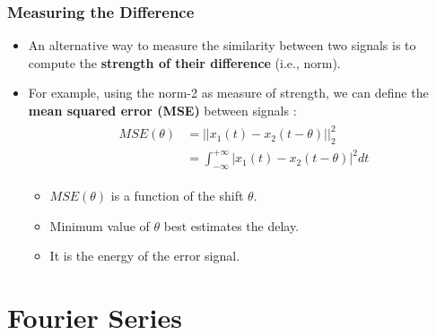\documentclass[12pt,a4paper]{article}
\begin{document}
 
\subsubsection{Measuring the Difference}
\begin{itemize}
\item An alternative way to measure the similarity between two signals is to compute the \textbf{strength of their difference} (i.e., norm). 

\item For example, using the norm-2 as measure of strength, we can define the \textbf{mean squared error (MSE)} between signals :
\begin{align*} \begin{split} 
MSE(\theta) &= \lvert \lvert x_{1}(t) - x_{2}(t-\theta) \rvert \rvert_{2}^{2}\\
&=\int_{-\infty}^{+\infty}  \lvert x_{1}(t) - x_{2}(t-\theta) \rvert^{2} dt
\end{split} \end{align*}
\begin{itemize}
\item $MSE(\theta)$ is a function of the shift $\theta$.
\item Minimum value of $\theta$ best estimates the delay. 
\item It is the energy of the error signal.
\end{itemize}
\end{itemize}

\newpage
\section{Fourier Series}
\end{document}
